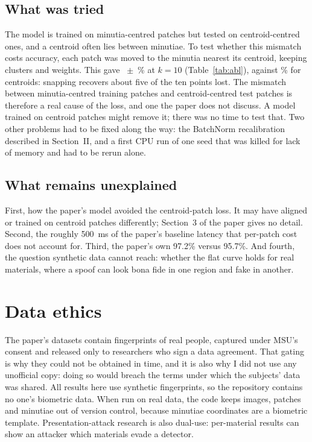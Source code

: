 \IfFileExists{IEEEtran.cls}{\documentclass[conference]{IEEEtran}}{\documentclass[twocolumn,10pt]{article}}
\begin{document}
\subsection{What was tried}
The model is trained on minutia-centred patches but tested on centroid-centred ones, and a centroid
often lies between minutiae. To test whether this mismatch costs accuracy, each patch was moved to the
minutia nearest its centroid, keeping clusters and weights. This gave \TDRnearTen~$\pm$~\TDRnearTenSD\%
at $k=10$ (Table~\ref{tab:abl}), against \TDRkTen\% for centroids: snapping recovers about five of
the ten points lost. The mismatch between minutia-centred training patches and centroid-centred test
patches is therefore a real cause of the loss, and one the paper does not discuss. A model trained on
centroid patches might remove it; there was no time to test that. Two other problems had to be fixed
along the way: the BatchNorm recalibration described in Section~II, and a first CPU run of one seed that
was killed for lack of memory and had to be rerun alone.

\subsection{What remains unexplained}
First, how the paper's model avoided the centroid-patch loss. It may have aligned or trained on
centroid patches differently; Section~3 of the paper gives no detail. Second, the roughly 500~ms of the paper's baseline latency that per-patch cost does not
account for. Third, the paper's own 97.2\% versus 95.7\%. And fourth, the question synthetic data cannot
reach: whether the flat curve holds for real materials, where a spoof can look bona fide in one region and
fake in another.

\section{Data ethics}
The paper's datasets contain fingerprints of real people, captured under MSU's consent and released only
to researchers who sign a data agreement. That gating is why they could not be obtained in time, and it is
also why I did not use any unofficial copy: doing so would breach the terms under which the subjects'
data was shared. All results here use synthetic fingerprints, so the repository contains no one's
biometric data. When run on real data, the code keeps images, patches and minutiae out of version
control, because minutiae coordinates are a biometric template. Presentation-attack research is also
dual-use: per-material results can show an attacker which materials evade a detector.
\end{document}
